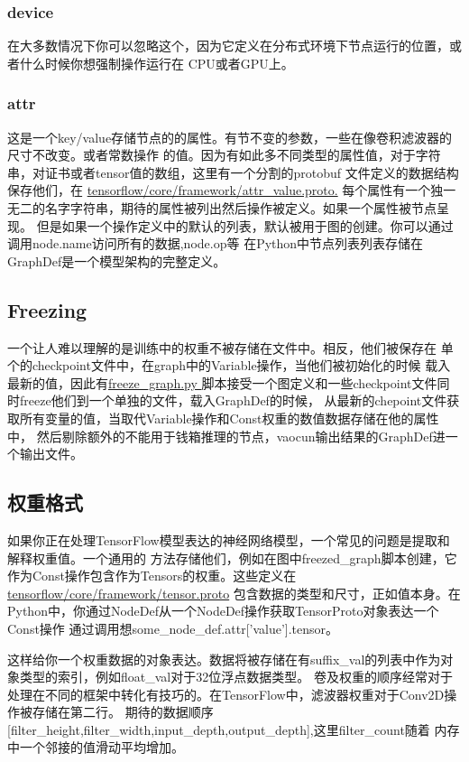 \subsubsection{device}
在大多数情况下你可以忽略这个，因为它定义在分布式环境下节点运行的位置，或者什么时候你想强制操作运行在
CPU或者GPU上。
\subsubsection{attr}
这是一个key/value存储节点的的属性。有节不变的参数，一些在像卷积滤波器的尺寸不改变。或者常数操作
的值。因为有如此多不同类型的属性值，对于字符串，对证书或者tensor值的数组，这里有一个分割的protobuf
文件定义的数据结构保存他们，在
\href{https://github.com/tensorflow/tensorflow/blob/master/tensorflow/core/framework/attr_value.proto}{tensorflow/core/framework/attr\_value.proto.}
每个属性有一个独一无二的名字字符串，期待的属性被列出然后操作被定义。如果一个属性被节点呈现。
但是如果一个操作定义中的默认的列表，默认被用于图的创建。你可以通过调用node.name访问所有的数据,node.op等
在Python中节点列表列表存储在GraphDef是一个模型架构的完整定义。
\subsection{Freezing}
一个让人难以理解的是训练中的权重不被存储在文件中。相反，他们被保存在
单个的checkpoint文件中，在graph中的Variable操作，当他们被初始化的时候
载入最新的值，因此有\href{https://github.com/tensorflow/tensorflow/blob/master/tensorflow/python/tools/freeze_graph.py}{freeze\_graph.py }
脚本接受一个图定义和一些checkpoint文件同时freeze他们到一个单独的文件，载入GraphDef的时候，
从最新的chepoint文件获取所有变量的值，当取代Variable操作和Const权重的数值数据存储在他的属性中，
然后剔除额外的不能用于钱箱推理的节点，vaocun输出结果的GraphDef进一个输出文件。
\subsection{权重格式}
如果你正在处理TensorFlow模型表达的神经网络模型，一个常见的问题是提取和解释权重值。一个通用的
方法存储他们，例如在图中freezed\_graph脚本创建，它作为Const操作包含作为Tensors的权重。这些定义在
\href{https://github.com/tensorflow/tensorflow/blob/master/tensorflow/core/framework/tensor.proto}{tensorflow/core/framework/tensor.proto}
包含数据的类型和尺寸，正如值本身。在Python中，你通过NodeDef从一个NodeDef操作获取TensorProto对象表达一个Const操作
通过调用想some\_node\_def.attr['value'].tensor。

这样给你一个权重数据的对象表达。数据将被存储在有suffix\_val的列表中作为对象类型的索引，例如float\_val对于32位浮点数据类型。
卷及权重的顺序经常对于处理在不同的框架中转化有技巧的。在TensorFlow中，滤波器权重对于Conv2D操作被存储在第二行。
期待的数据顺序[filter\_height,filter\_width,input\_depth,output\_depth],这里filter\_count随着
内存中一个邻接的值滑动平均增加。
